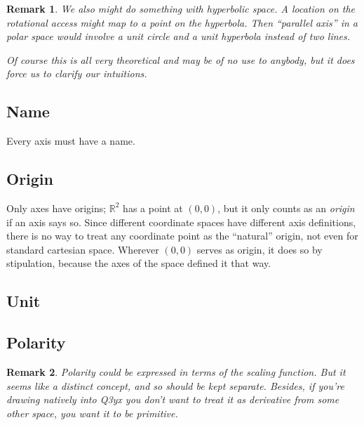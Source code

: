 \documentclass[12pt]{tufte-handout}
\numberwithin{equation}{subsection}
\numberwithin{equation}{subsection}
\newtheorem{remark}{Remark}
\newcommand\cspace{coordinate space}
\newcommand\Rtwo{\(\mathds{R}^2\)}
\begin{document}
{\begin{description}
\begin{remark}
      We also might do something with hyperbolic space.  A location
      on the rotational access might map to a point on the
      hyperbola.  Then ``parallel axis'' in a polar space would
      involve a unit circle and a unit hyperbola instead of two
      lines.

      Of course this is all very theoretical and may be of no use to
      anybody, but it does force us to clarify our intuitions.
    \end{remark}

  \item[Hyperbolic]

  \end{description}

  \subsection{Name}
  \label{subs:axisname}

  Every axis must have a name.

  \subsection{Origin}
  \label{subs:axisorigin}

  Only axes have origins; \Rtwo{} has a point at \((0,0)\), but it only
  counts as an \textit{origin} if an axis says so.  Since
  different \cspace{}s have different axis definitions, there is no
  way to treat any coordinate point as the ``natural'' origin, not
  even for standard cartesian space.  Wherever \((0,0)\) serves as
  origin, it does so by stipulation, because the axes of the space
  defined it that way.

  \subsection{Unit}
  \label{subs:axisunit}


  \subsection{Polarity}
  \label{subs:polarity}

  \begin{remark}
    Polarity could be expressed in terms of the scaling function.  But
    it seems like a distinct concept, and so should be kept separate.
    Besides, if you're drawing natively into Q3yx you don't want to
    treat it as derivative from some other space, you want it to be
    primitive.
  \end{remark}

}
\end{document}
